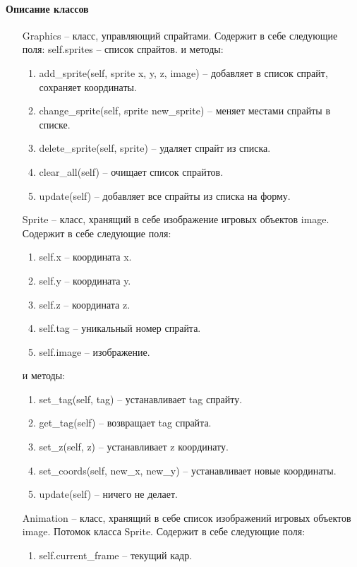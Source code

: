 \paragraph{Описание классов}
\begin{enumerate}
	\item[Graphics] -- класс, управляющий спрайтами. Содержит в себе следующие поля:
		self.sprites -- список спрайтов.
		и методы:
	\begin{enumerate}
		\item add\_sprite(self, sprite x, y, z, image) -- добавляет в список спрайт, сохраняет координаты.
		\item change\_sprite(self, sprite new\_sprite) -- меняет местами спрайты в списке.
		\item delete\_sprite(self, sprite) -- удаляет спрайт из списка.
		\item clear\_all(self) -- очищает список спрайтов.
		\item update(self) -- добавляет все спрайты из списка на форму.
	\end{enumerate}
	\item[Sprite] -- класс, хранящий в себе изображение игровых объектов image. Содержит в себе следующие поля:
	\begin{enumerate}
		\item self.x -- координата x.
		\item self.y -- координата y.
		\item self.z -- координата z.
		\item self.tag -- уникальный номер спрайта.
		\item self.image -- изображение.
	\end{enumerate}
	и методы:
	\begin{enumerate}
		\item set\_tag(self, tag) -- устанавливает tag спрайту.
		\item get\_tag(self) -- возвращает tag спрайта.
		\item set\_z(self, z) -- устанавливает z координату.
		\item set\_coords(self, new\_x, new\_y) -- устанавливает новые координаты.
		\item update(self) -- ничего не делает.
	\end{enumerate}
	\item[Animation] -- класс, хранящий в себе список изображений игровых объектов image. Потомок класса Sprite.  Содержит в себе следующие поля:
	\begin{enumerate}
		\item self.current\_frame -- текущий кадр.

\end{enumerate}
\end{enumerate}
